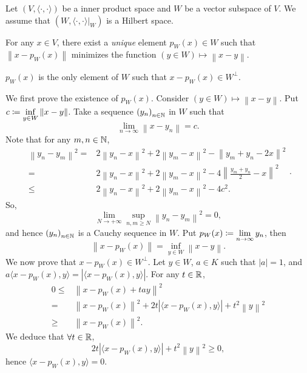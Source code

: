 \begin{theoremenv}\label{3.2.2}
    Let $\left(V,\langle \cdot,\cdot\rangle\right)$ be a inner product space and $W$ be a vector subspace of $V$. We assume that $\left(W, \left.\langle\cdot,\cdot\rangle\right|_{W}\right)$ is a Hilbert space.
    
    \quad For any $x\in V$, there exist a \textit{unique} element $p_W(x) \in W$ such that $\left\| x - p_W(x)\right\|$ minimizes the function $ \left(y \in W\right) \mapsto \left\| x - y\right\|$.
    
    \quad $p_W(x)$ is the only element of $W$ such that $x - p_W(x) \in W^\perp$.
\end{theoremenv}
\begin{proofenv}
    We first prove the existence of $p_W(x)$. 
    Consider $\left( y \in W\right) \mapsto \left\| x- y\right\|$.
    Put $\displaystyle c\coloneq \inf_{y \in W} \left\| x- y\right\|$.
    Take a sequence $\left(y_n\right)_{n\in \mathbb{N}}$ in $W$ such that $$\lim_{n\rightarrow \infty} \left\| x - y_n\right\| = c.$$
    Note that for any $m,n\in \mathbb{N}$,
    $$\begin{array}{rl}
        \left\| y_n - y_m\right\|^2 =& 2\left\| y_n - x\right\|^2 + 2\left\| y_m - x\right\|^2 - \left\| y_m + y_n -2x\right\|^2 \\
        = & 2\left\| y_n - x\right\|^2 + 2\left\| y_m - x\right\|^2 - 4 \left\| \frac{y_m + y_n}{2} - x \right\|^2 \\
        \le& 2 \left\| y_n - x\right\|^2 + 2 \left\| y_m - x\right\|^2 - 4 c^2.
    \end{array}.$$
    So, 
    $$ \lim_{ N \rightarrow +\infty} \sup_{n,m\ge N} \left\| y_n - y_m\right\|^2 = 0,$$
    and hence $\left(y_n\right)_{n\in \mathbb{N}}$ is a Cauchy sequence in $W$.
    Put $\displaystyle p_W(x) \coloneq \lim_{n\rightarrow \infty} y_n$, then
    $$ \left\| x - p_W(x)\right\| = \inf_{y\in W} \left\| x - y\right\|.$$
    We now prove that $x - p_W(x) \in W^\perp$.
    Let $y\in W$, $a\in K$ such that $|a|=1$, and $a \langle x -p_W(x) , y\rangle = \left| \langle x- p_W(x), y\rangle\right|.$
    For any $t\in \mathbb{R}$,
    $$ \begin{array}{rl}
        0 \le& \left\| x - p_W(x) + t a y\right\|^2 \\
        =& \left\| x - p_W(x)\right\|^2 + 2t \left| \langle x - p_W(x), y\rangle\right| + t^2 \left\| y\right\|^2\\
        \ge& \left\| x - p_W(x)\right\|^2.
    \end{array}$$
    We deduce that $\forall t \in \mathbb{R}$,
    $$2t\left| \langle x - p_W(x), y\rangle\right| + t^2 \left\| y\right\|^2 \ge 0,$$
    hence $\langle x - p_W(x) ,y\rangle =0$.


\end{proofenv}
